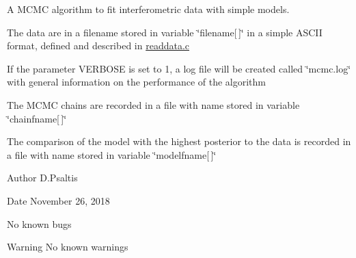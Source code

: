 A M\+C\+MC algorithm to fit interferometric data with simple models.

The data are in a filename stored in variable \char`\"{}filename\mbox{[}$\,$\mbox{]}\char`\"{} in a simple A\+S\+C\+II format, defined and described in \hyperlink{readdata_8c}{readdata.\+c}

If the parameter V\+E\+R\+B\+O\+SE is set to 1, a log file will be created called \char`\"{}mcmc.\+log\char`\"{} with general information on the performance of the algorithm

The M\+C\+MC chains are recorded in a file with name stored in variable \char`\"{}chainfname\mbox{[}$\,$\mbox{]}\char`\"{}

The comparison of the model with the highest posterior to the data is recorded in a file with name stored in variable \char`\"{}modelfname\mbox{[}$\,$\mbox{]}\char`\"{}

\begin{DoxyAuthor}{Author}
D.\+Psaltis
\end{DoxyAuthor}
\begin{DoxyDate}{Date}
November 26, 2018
\end{DoxyDate}
No known bugs

\begin{DoxyWarning}{Warning}
No known warnings 
\end{DoxyWarning}
